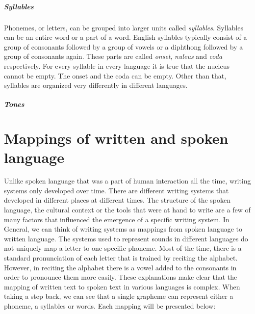 \subparagraph{Syllables} Phonemes, or letters, can be grouped into larger units called \textit{syllables}. Syllables can be an entire word or a part of a word. English syllables typically consist of a group of consonants followed by a group of vowels or a diphthong followed by a group of consonants again. These parts are called \textit{onset}, \textit{nuleus} and \textit{coda} respectively.  For every syllable in every language it is true that the nucleus cannot be empty. The onset and the coda can be empty. Other than that, syllables are organized very differently in different languages. \citep{Intro.2007}

\subparagraph{Tones} 


\section{Mappings of written and spoken language}
\label{writing-sys}
Unlike spoken language that was a part of human interaction all the time, writing systems only developed over time. There are different writing systems that developed in different places at different times. The structure of the spoken language, the cultural context or the tools that were at hand to write are a few of many factors that influenced the emergence of a specific writing system. In General, we can think of writing systems as mappings from spoken language to written language. The systems used to represent sounds in different languages do not uniquely map a letter to one specific phoneme. Most of the time, there is a standard pronunciation of each letter that is trained by reciting the alphabet. However, in reciting the alphabet there is a vowel added to the consonants in order to pronounce them more easily. These explanations make clear that the mapping of written text to spoken text in various languages is complex. When taking a step back, we can see that a single grapheme can represent either a phoneme, a syllables or words. Each mapping will be presented below: 

